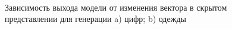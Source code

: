 \begin{figure}[h!t]\center
{}
\qquad
{}\\
\caption{Зависимость выхода модели от изменения вектора в скрытом представлении для генерации a) цифр; b) одежды}
\end{figure}\\

